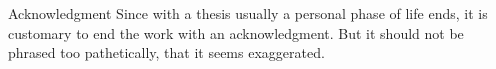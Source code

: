\vspace*{0pt plus 1fill}
\begin{tucsimplesection}{Acknowledgment}
Since with a thesis usually a personal phase of life ends, it is customary to end the work with an acknowledgment. 
But it should not be phrased too pathetically, that it seems exaggerated.

\lipsum[1-2]
\end{tucsimplesection}
\vspace*{0pt plus 2.5fill}
